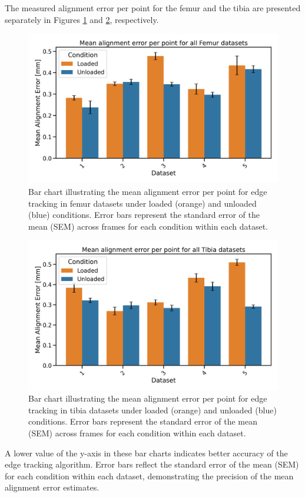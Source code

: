 \documentclass{micro-econ-thesis}
\begin{document}
The measured alignment error per point for the femur and the tibia are presented separately in Figures \ref{fig:barfemur} and \ref{fig:bartibia}, respectively. 
\begin{figure}[H]
	\centering
	\includegraphics[width=0.7\linewidth]{bar_no_1_3_Femur_both.png}
	\caption{Bar chart illustrating the mean alignment error per point for edge tracking in femur datasets under loaded (orange) and unloaded (blue) conditions. Error bars represent the standard error of the mean (SEM) across frames for each condition within each dataset.}
	\label{fig:barfemur}
\end{figure}

\begin{figure}[H]
	\centering
	\includegraphics[width=0.7\linewidth]{bar_no_1_3_Tibia_both.png}
	\caption{Bar chart illustrating the mean alignment error per point for edge tracking in tibia datasets under loaded (orange) and unloaded (blue) conditions. Error bars represent the standard error of the mean (SEM) across frames for each condition within each dataset.}
	\label{fig:bartibia}
\end{figure}

A lower value of the y-axis in these bar charts indicates better accuracy of the edge tracking algorithm. Error bars reflect the standard error of the mean (SEM) for each condition within each dataset, demonstrating the precision of the mean alignment error estimates.  
\end{document}
